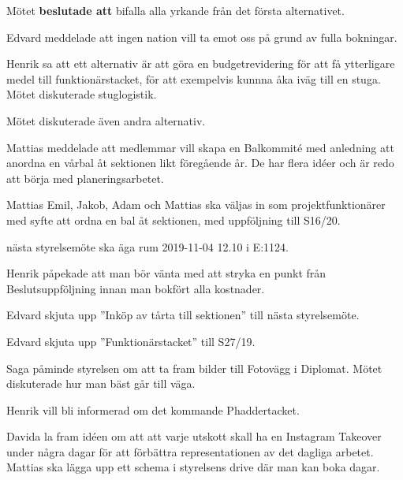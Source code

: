 \documentclass[10pt]{article}
\begin{document}
\begin{paragrafer}
Mötet \textbf{beslutade att} bifalla alla yrkande från det första alternativet. 


Edvard meddelade att ingen nation vill ta emot oss på grund av fulla bokningar. 

Henrik sa att ett alternativ är att göra en budgetrevidering för att få ytterligare medel till funktionärstacket, för att exempelvis kunnna åka iväg till en stuga. Mötet diskuterade stuglogistik. 

Mötet diskuterade även andra alternativ.

Mattias meddelade att medlemmar vill skapa en Balkommité med anledning att anordna en vårbal åt sektionen likt föregående år. De har flera idéer och är redo att börja med planeringsarbetet. 

Mattias \ypa Emil, Jakob, Adam och Mattias ska väljas in som projektfunktionärer med syfte att ordna en bal åt sektionen, med uppföljning till S16/20. 

\Mbaby

\Mba nästa styrelsemöte ska äga rum 2019-11-04 12.10 i E:1124.



Henrik påpekade att man bör vänta med att stryka en punkt från Beslutsuppföljning innan man bokfört alla kostnader. 

Edvard \ypa skjuta upp ''Inköp av tårta till sektionen'' till nästa styrelsemöte. %

\Mbaby

Edvard \ypa skjuta upp ''Funktionärstacket'' till S27/19.   

\Mbaby

Saga påminde styrelsen om att ta fram bilder till Fotovägg i Diplomat. Mötet diskuterade hur man bäst går till väga.  

Henrik vill bli informerad om det kommande Phaddertacket.

Davida la fram idéen om att att varje utskott skall ha en Instagram Takeover under några dagar för att förbättra representationen av det dagliga arbetet. 
Mattias ska lägga upp ett schema i styrelsens drive där man kan boka dagar.


\end{paragrafer}
\end{document}
